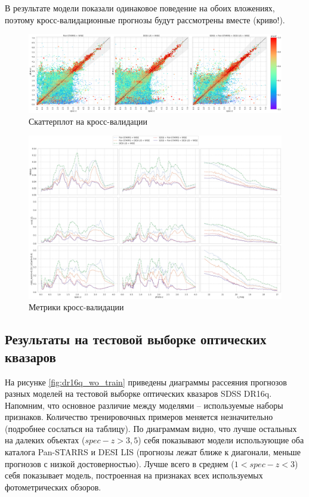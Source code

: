 \documentclass[fleqn,usenatbib]{mnras}
\begin{document}
В результате модели показали одинаковое поведение на обоих вложениях, поэтому кросс-валидационные прогнозы будут рассмотрены вместе (криво!).

\begin{figure}
    \centering
    \includegraphics[width=0.9\linewidth]{images/scatterplots-cv2-total.png}
    \caption{Скаттерплот на кросс-валидации}
    \label{fig:my_label}
\end{figure}

\begin{figure}
    \centering
    \includegraphics[width=0.9\linewidth]{images/metrics-cv2-ab.png}
    \caption{Метрики кросс-валидации}
    \label{fig:metrics-cv2-ab}
\end{figure}

\subsection{Результаты на тестовой выборке оптических квазаров}

На рисунке \ref{fig:dr16q_wo_train} приведены диаграммы рассеяния прогнозов разных моделей на тестовой выборке оптических квазаров SDSS DR16q. Напомним, что основное различие между моделями -- используемые наборы признаков. Количество тренировочных примеров меняется незначительно (подробнее сослаться на таблицу). По диаграммам видно, что  лучше остальных на далеких объектах ($spec-z > 3,5$) себя показывают модели использующие оба каталога Pan-STARRS и DESI LIS (прогнозы лежат ближе к диагонали, меньше прогнозов с низкой достоверностью). Лучше всего в среднем ($1 < spec-z < 3$) себя показывает модель, построенная на признаках всех используемых фотометрических обзоров.
\end{document}
